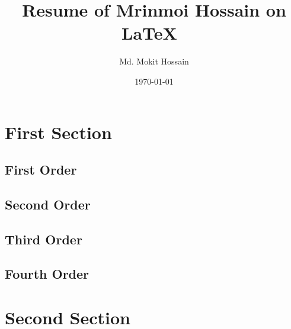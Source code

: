\documentclass[11pt]{article}
\begin{document}
\title{Resume of Mrinmoi Hossain on \LaTeX \ }
\author{Md. Mokit Hossain}
\date{\today}
\maketitle

\section{First Section}
	\subsection{First Order}
	\subsection{Second Order}
	\subsection{Third Order}
	\subsection{Fourth Order}
\section{Second Section}
\end{document}
